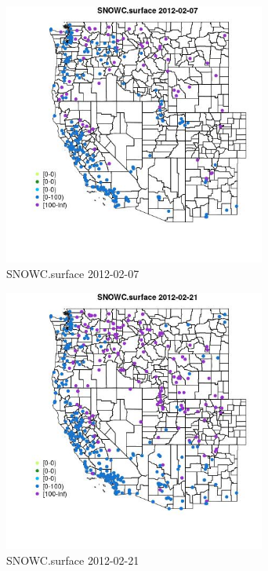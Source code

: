 \begin{figure} 
\centering  
\includegraphics[width=0.77\textwidth]{Code_Outputs/Report_ML_input_PM25_Step4_part_f_de_duplicated_aves_prioritize_24hr_obswNAs_MapObsSNOWCsurface2012-02-07.jpg} 
\caption{\label{fig:Report_ML_input_PM25_Step4_part_f_de_duplicated_aves_prioritize_24hr_obswNAsMapObsSNOWCsurface2012-02-07}SNOWC.surface 2012-02-07} 
\end{figure} 
 

\begin{figure} 
\centering  
\includegraphics[width=0.77\textwidth]{Code_Outputs/Report_ML_input_PM25_Step4_part_f_de_duplicated_aves_prioritize_24hr_obswNAs_MapObsSNOWCsurface2012-02-21.jpg} 
\caption{\label{fig:Report_ML_input_PM25_Step4_part_f_de_duplicated_aves_prioritize_24hr_obswNAsMapObsSNOWCsurface2012-02-21}SNOWC.surface 2012-02-21} 
\end{figure} 
 

